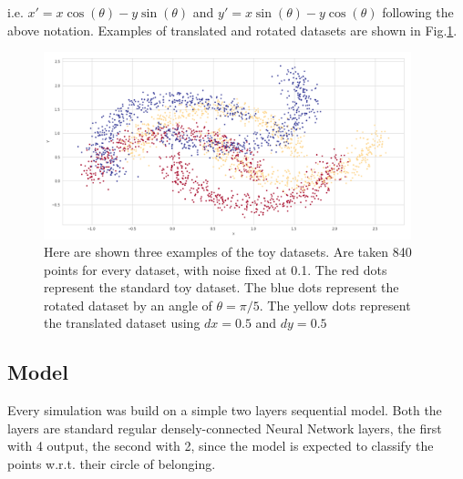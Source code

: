 \documentclass{article} %
\newcounter{points}
\newcounter{late}
\begin{document}
i.e. $x'=x\cos(\theta)-y\sin(\theta)$ and $y'=x\sin(\theta)-y\cos(\theta)$ following 
the above notation.
Examples of translated and rotated datasets are shown in Fig.\ref{fig2}.
\begin{figure}[!h]
    \centering
    \includegraphics[width=0.95\textwidth, keepaspectratio]{images/datasets_examples.png}
    \caption{Here are shown three examples of the toy datasets. Are taken 840 points for 
        every dataset, with noise fixed at 0.1. The red dots represent the standard toy 
        dataset. The blue dots represent the rotated dataset by an angle of $\theta=\pi/5$.
        The yellow dots represent the translated dataset using $dx=0.5$ and $dy=0.5$}
    \label{fig2}
\end{figure}

\subsection{Model}
Every simulation was build on a simple two layers sequential model.
Both the layers are standard regular densely-connected Neural Network layers, the first 
with 4 output, the second with 2, since the model is expected to classify the points 
w.r.t. their circle of belonging.
\end{document}
